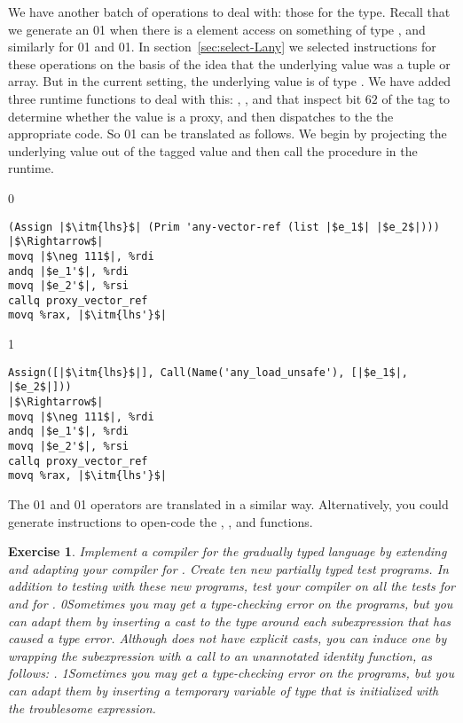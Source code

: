 \documentclass[7x10]{TimesAPriori_MIT}%
\def\racketEd{0}
\def\pythonEd{1}
\def\edition{1}
\newcommand{\racket}[1]{{\if\edition\racketEd{#1}\fi}}
\newcommand{\pythonColor}[0]{}
\newcommand{\python}[1]{{\if\edition\pythonEd\pythonColor #1\fi}}
\newtheorem{exercise}[theorem]{Exercise}
\numberwithin{theorem}{chapter}
\numberwithin{definition}{chapter}
\numberwithin{equation}{chapter}
\begin{document}
We have another batch of operations to deal with: those for the
\CANYTY{} type. Recall that we generate an
\racket{}\python{} when
there is a element access on something of type \CANYTY{}, and
similarly for
\racket{}\python{} and
\racket{}\python{}. In
section~\ref{sec:select-Lany} we selected instructions for these
operations on the basis of the idea that the underlying value was a tuple or
array. But in the current setting, the underlying value is of type
\PTUPLETYNAME{}\python{ or \PARRAYTYNAME{}}.  We have added three runtime
functions to deal with this:
,
, and
 that inspect bit $62$ of the tag
to determine whether the value is a proxy, and then
dispatches to the the appropriate code.
%
So \racket{}\python{}
can be translated as follows.
We begin by projecting the underlying value out of the tagged value and
then call the  procedure in the runtime.
{\if\edition\racketEd
\begin{lstlisting}
(Assign |$\itm{lhs}$| (Prim 'any-vector-ref (list |$e_1$| |$e_2$|)))
|$\Rightarrow$|
movq |$\neg 111$|, %rdi
andq |$e_1'$|, %rdi
movq |$e_2'$|, %rsi
callq proxy_vector_ref
movq %rax, |$\itm{lhs'}$|
\end{lstlisting}
\fi}
{\if\edition\pythonEd\pythonColor
\begin{lstlisting}
Assign([|$\itm{lhs}$|], Call(Name('any_load_unsafe'), [|$e_1$|, |$e_2$|]))
|$\Rightarrow$|
movq |$\neg 111$|, %rdi
andq |$e_1'$|, %rdi
movq |$e_2'$|, %rsi
callq proxy_vector_ref
movq %rax, |$\itm{lhs'}$|
\end{lstlisting}
\fi}
\noindent The \racket{}\python{}
and \racket{}\python{} operators 
are translated in a similar way. Alternatively, you could generate
instructions to open-code
the , ,
and  functions.

\begin{exercise}\normalfont\normalsize
  Implement a compiler for the gradually typed \LangGrad{} language by
  extending and adapting your compiler for \LangLam{}. Create ten new
  partially typed test programs. In addition to testing with these
  new programs, test your compiler on all the tests for \LangLam{}
  and for \LangDyn{}.
%
  \racket{Sometimes you may get a type-checking error on the
    \LangDyn{} programs, but you can adapt them by inserting a cast to
    the \CANYTY{} type around each subexpression that has caused a type
    error. Although \LangDyn{} does not have explicit casts, you can
    induce one by wrapping the subexpression \code{e} with a call to
    an unannotated identity function, as follows: \code{((lambda (x) x) e)}.}
%
  \python{Sometimes you may get a type-checking error on the
    \LangDyn{} programs, but you can adapt them by inserting a
    temporary variable of type \CANYTY{} that is initialized with the
    troublesome expression.}
\end{exercise}
\end{document}
